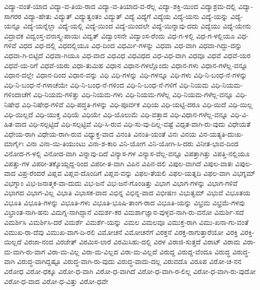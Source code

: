 ವಿದ್ಯಾ-ವಂತೆ-ಯಾದ
ವಿದ್ಯಾ-ವ-ತಿಯ-ರಾದ
ವಿದ್ಯಾ-ವ-ತಿಯಾದ-ವ-ರೆಲ್ಲ
ವಿದ್ಯಾ-ಶಕ್ತಿ-ಯಿಂದ
ವಿದ್ಯಾಶ್ರಮ-ದಲ್ಲಿ
ವಿದ್ಯಾ-ಸಾಗರರ
ವಿದ್ಯಾ-ಹೇತು
ವಿದ್ಯುತ್
ವಿದ್ಯುತ್ವಂತಂ
ವಿದ್ಯುತ್‌
ವಿದ್ಯೆ
ವಿದ್ಯೆಗೆ
ವಿದ್ಯೆಯ
ವಿದ್ಯೆ-ಯನು
ವಿದ್ಯೆ-ಯನ್ನು
ವಿದ್ಯೆ-ಯನ್ನೂ
ವಿದ್ಯೆ-ಯನ್ನೆಲ್ಲಾ
ವಿದ್ಯೆ-ಯಲ್ಲಿ
ವಿದ್ಯೆ-ಯಿಂದ
ವಿದ್ಯೆ-ಯಿಂದಲೇ
ವಿದ್ಯೆ-ಯಿನ್ನಾವು-ದದು
ವಿದ್ಯೆಯು
ವಿದ್ಯೆ-ಯೇನು
ವಿದ್ರಾವಕ
ವಿದ್ವಂಸ್ತ-ವನಾಸ್ತ್ಯ-ಪಾಯಃ
ವಿದ್ವತ್
ವಿದ್ವಾಂಸನೇ
ವಿದ್ವಾಂಸ-ರೆಂದು
ವಿಧ-ಗ-ಳಲ್ಲಿ
ವಿಧ-ಗ-ಳಲ್ಲಿಯೂ
ವಿಧ-ಗಳಿವೆ
ವಿಧದ
ವಿಧ-ದಲ್ಲಿ
ವಿಧದಲ್ಲಿಯೂ
ವಿಧ-ದಿಂದ
ವಿಧರ್ಮಿ-ಗಳನ್ನು
ವಿಧವಾ
ವಿಧ-ವಾಗಿ
ವಿಧವಾ-ಗಿದ್ದು-ದನ್ನು
ವಿಧವಾ-ಗಿ-ಬಿಟ್ಟಿದೆ
ವಿಧವಾ-ಗಿಯೂ
ವಿಧ-ವಾದ
ವಿಧವಿಧ
ವಿಧವಿಧದ
ವಿಧ-ವಿಧ-ವಾಗಿ
ವಿಧವೂ
ವಿಧವೆ
ವಿಧವೆ-ಯರ
ವಿಧವೆ-ಯ-ರಿಗೆ
ವಿಧವೆ-ಯರು
ವಿಧಾ-ತುಮಿಹ
ವಿಧಾನ
ವಿಧಾನ-ಗಳಲ್ಲೊಂದು
ವಿಧಾನ-ಗಳು
ವಿಧಾನ-ಗಳೆಲ್ಲ-ವನ್ನೂ
ವಿಧಾನ-ದಲ್ಲೇ
ವಿಧಾನ-ದಿಂದ
ವಿಧಾನ-ವನ್ನು
ವಿಧಿ
ವಿಧಿ-ಗಳನ್ನು
ವಿಧಿ-ಗಳನ್ನೂ
ವಿಧಿ-ಗಳು
ವಿಧಿ-ನಿ-ಬಂಧ-ನೆ-ಗಳನ್ನು
ವಿಧಿ-ನಿ-ಬಂಧ-ನೆ-ಗಳಾಚೆಯೇ
ವಿಧಿ-ನಿ-ಬಂಧ-ನೆ-ಗಳಿಂದ
ವಿಧಿ-ನಿ-ಬಂಧ-ನೆ-ಗಳಿಗೆ
ವಿಧಿ-ನಿಯಮ
ವಿಧಿ-ನಿಯಮ-ಗಳಿಂದಾಚೆಗೆ
ವಿಧಿ-ನಿಯಮ-ಗಳಿತ್ತು
ವಿಧಿ-ನಿಯಮ-ಗಳು
ವಿಧಿ-ನಿಯಮ-ಗಳೆಲ್ಲ
ವಿಧಿ-ನಿಯಮ-ಗಳೆಲ್ಲ-ವನ್ನೂ
ವಿಧಿ-ನಿಷೇಧ
ವಿಧಿ-ನಿಷೇಧ-ಗಳಿವೆ
ವಿಧಿ-ಪದ್ಧತಿ-ಗಳನ್ನು
ವಿಧಿ-ಪೂರ್ವಕ
ವಿಧಿಯ
ವಿಧಿ-ಯಟ್ಟಿ-ದರೂ
ವಿಧಿ-ಯಿದೆ
ವಿಧಿ-ಯಿಲ್ಲ
ವಿಧಿ-ಯಿಲ್ಲದೆ
ವಿಧಿ-ಯುಕ್ತ
ವಿಧಿಯೆ
ವಿಧಿಯೇ
ವಿಧಿ-ಯೊಲುಮೆ
ವಿಧಿ-ವತ್ತಾದ
ವಿಧಿ-ವಿಧಾನ-ಗಳೆಲ್ಲ-ವನ್ನೂ
ವಿಧಿ-ವಿ-ಹಿತ-ವಾದ
ವಿಧಿ-ಸಲ್ಪಟ್ಟಿದೆ
ವಿಧಿ-ಸಲ್ಪಟ್ಟಿವೆ
ವಿಧಿ-ಸಿ-ರುವ
ವಿಧಿ-ಸು-ವು-ದಿಲ್ಲ-ವಷ್ಟೆ
ವಿಧೃತ-ವಾಗಿ-ರು-ವುದು
ವಿಧೇಯತೆ
ವಿಧೇಯ-ರಾಗಿ
ವಿಧೇಯ-ರಾಗಿ-ರುವ
ವಿಧ್ಯುಕ್ತ-ವಾದ
ವಿನಂತಿ
ವಿನಂತಿ-ಯಂತೆ
ವಿನಃ
ವಿನಯ
ವಿನ-ಯತ್ಯತಿ-ದುಃಖ-ಮಾರ್ಗೈಃ
ವಿನಾ
ವಿನಾ-ಯಿ-ತಿಯುಂಟು
ವಿನಾ-ಶ-ಕಾರಿ
ವಿನಿ-ಯೋಗ
ವಿನಿ-ಯೋಗಿ-ಸಿ-ದರು
ವಿನೀತ-ಭಾವ-ದಿಂದ
ವಿನೋದ-ಗ-ಳಲ್ಲಿ
ವಿನೋದ-ವಾಗಿ
ವಿನ್ನಾವು-ದಿದೆ
ವಿನ್ಯಾಸ-ಗಳ
ವಿನ್ಯಾಸ-ವೆಲ್ಲ-ವನ್ನೂ
ವಿಪತ್ತಾಗಿತ್ತು
ವಿಪತ್ತಿ-ನಲ್ಲಿಯೂ
ವಿಪತ್ತು-ಗಳ
ವಿಪರೀ-ತಕ್ಕೊಯ್ದದ್ದ-ರಿಂದ
ವಿಪರೀ-ತ-ವಾಗಿ
ವಿಪಿನ
ವಿಪಿನ-ದಲಿ
ವಿಪುಲ-ವಾಗಿದೆ
ವಿಪುಲ-ವಾತಃ
ವಿಪುಲ-ವಾದ
ವಿಪ್ರ-ರೆಂದರೆ
ವಿಪ್ಲವ
ವಿಪ್ಲವ-ದೊಂದಿಗೆ
ವಿಪ್ಲವ-ವನ್ನು
ವಿಫಲ-ತೆಯಲಿ
ವಿಫಲ-ಯತ್ನದಿ
ವಿಫಲ-ವಾಗಿ
ವಿಭಗ್ನಮ್
ವಿಭಗ್ನಾಂ
ವಿಭ-ಜನಾತ್ಮಕ-ವಾ-ದುದು
ವಿಭ-ಜನೆ
ವಿಭ-ಜನೆ-ಗೊಂಡಿತ್ತು
ವಿಭಾಗ
ವಿಭಾಗ-ಗಳನ್ನು
ವಿಭಾಗ-ಗಳಿವೆ
ವಿಭಾಗದ
ವಿಭಾಗ-ವಿಲ್ಲ
ವಿಭಾತಿ
ವಿಭಾಸಕ-ವಾದ
ವಿಭಿನ್ನ
ವಿಭಿನ್ನ-ವಾದ
ವಿಭೀಷಣ
ವಿಭುತ್ವಮ್
ವಿಭುವೆ
ವಿಭೂತಯ
ವಿಭೂತಿ
ವಿಭೂತಿ-ಗಳನ್ನು
ವಿಭೂತಿ-ಗಳು
ವಿಭೂತಿ-ಭೂಷಿ-ತಾಂಗ-ರಾದ
ವಿಭೂತಿ-ಯನ್ನು
ವಿಭ್ರಮ
ವಿಭ್ರಮೆ-ಗಳವು
ವಿಭ್ರಾಂತ-ನಾಗಿ-ಹನು
ವಿಮಗ್ನ-ನಾಗಿದ್ದಾನೆ
ವಿಮರ್ಶ-ಕರ
ವಿಮರ್ಶಾಜ್ಞಾನ-ವುಳ್ಳವ-ನಾಗಿ-ರು-ವನೋ
ವಿಮರ್ಶಿ-ಸದೆ
ವಿಮರ್ಶಿಸಿ
ವಿಮರ್ಶಿಸಿ-ದರೆ
ವಿಮರ್ಶೆ
ವಿಮರ್ಶೆ-ಯನ್ನು
ವಿಮಲ
ವಿಮಲವೂ
ವಿಮುಕ್ತ-ರಾಗಿ
ವಿಮು-ಖನಾ-ಗು-ವಂತೆ
ವಿಮುಖ-ರಾ-ದೆವು
ವಿಮುಖ-ವಾಗ-ದಿ-ರಲಿ
ವಿಮೋಚನೆ
ವಿಮೋಚನೆಗೆ
ವಿರಕ್ತನೆ
ವಿರಕ್ತ-ರಾಗುತ್ತಾರೆಯೋ
ವಿರಕ್ತಿ
ವಿರಕ್ತಿ-ಯಿಲ್ಲದೆ
ವಿರಜಾ-ನಂದ
ವಿರಜೇತ್
ವಿರಮಿಸ-ಲಾರೆ
ವಿರಮಿಸಿಹು-ದಲ್ಲಿ
ವಿರಳ
ವಿರಾಜಿ-ಸುತ್ತದೆ
ವಿರಾಟ್
ವಿರಾಮ
ವಿರಾ-ಮ-ವಾಗಿ-ರು-ವಾಗ
ವಿರಾ-ಮ-ವಿಲ್ಲ
ವಿರಾ-ಮ-ವಿಲ್ಲದ
ವಿರಾ-ಮ-ವಿಲ್ಲದೆ
ವಿರುದ್ದ
ವಿರುದ್ದ-ವೆಂದೂ
ವಿರುದ್ಧ
ವಿರುದ್ಧ-ವಾಗಿ
ವಿರುದ್ಧ-ವಾಗಿದ್ದಷ್ಟೂ
ವಿರುದ್ಧ-ವಾಗಿ-ರು-ವುದು
ವಿರುದ್ಧ-ವಾದು-ದಲ್ಲ
ವಿರುವದೊ
ವಿರೂಪ
ವಿರೋ-ಚ-ನನ
ವಿರೋಧ
ವಿರೋ-ಧಕ್ಕೂ
ವಿರೋ-ಧ-ವಾಗಿ
ವಿರೋ-ಧ-ವಾಗಿದೆ
ವಿರೋ-ಧ-ವಾಗಿ-ರ-ಲಿಲ್ಲ
ವಿರೋ-ಧ-ವಾಗಿ-ರು-ವುದೋ
ವಿರೋ-ಧ-ವಾದ
ವಿರೋ-ಧ-ವಿತ್ತು
ವಿರೋ-ಧವೇ
